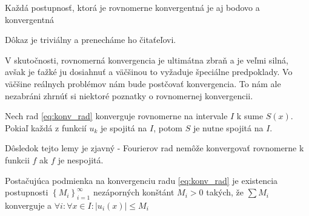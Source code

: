 \begin{lema}
    Každá postupnosť, ktorá je rovnomerne konvergentná je aj bodovo a
     konvergentná
\end{lema}
\begin{dokaz}
    Dôkaz je triviálny a prenecháme ho čitaťeľovi.
\end{dokaz}

V skutočnosti, rovnomerná konvergencia je ultimátna zbraň a je veľmi
silná, avšak je ťažké ju dosiahnuť a väčšinou to vyžaduje špeciálne
predpoklady. Vo väčšine reálnych problémov nám bude postčovať
 konvergencia. To nám ale nezabráni zhrnúť si
niektoré poznatky o rovnomernej konvergencii.

\begin{lema}
    Nech rad \ref{eq:konv_rad} konverguje rovnomerne na intervale $I$
    k sume $S(x)$. Pokiaľ každá z funkcií $u_k$ je spojitá na $I$,
    potom $S$ je nutne spojitá na $I$.
\end{lema}

Dôsledok tejto lemy je zjavný - Fourierov rad nemôže konvergovať
rovnomerne k funkcii $f$ ak $f$ je nespojitá.

\begin{lema}
  Postačujúca podmienka na konvergenciu radu \ref{eq:konv_rad}
  je existencia postupnosti $\left\{M_i\right\}_{i=1}^\infty$
  nezáporných konštánt $M_i>0$ takých, že
  $\sum M_i$ konverguje a $\forall i: \forall x\in I: |u_i(x)|\le M_i$
\end{lema}

